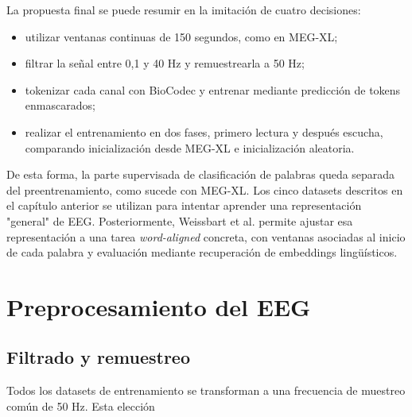 La propuesta final se puede resumir en la imitación de cuatro decisiones:

\begin{itemize}
\setlength{\itemsep}{0pt}
\setlength{\parsep}{0pt}
\setlength{\topsep}{2pt}
\setlength{\partopsep}{0pt}
\item utilizar ventanas continuas de 150 segundos, como en MEG-XL;
\item filtrar la señal entre 0,1 y 40 Hz y remuestrearla a 50 Hz;
\item tokenizar cada canal con BioCodec y entrenar mediante predicción de tokens enmascarados;
\item realizar el entrenamiento en dos fases, primero lectura y después escucha, comparando inicialización desde MEG-XL e inicialización aleatoria.
\end{itemize}

De esta forma, la parte supervisada de clasificación de palabras queda separada del preentrenamiento, como sucede con MEG-XL. Los cinco datasets descritos en el capítulo anterior se utilizan para intentar aprender una representación "general" de EEG. Posteriormente, Weissbart et al. permite ajustar esa representación a una tarea \textit{word-aligned} concreta, con ventanas asociadas al inicio de cada palabra y evaluación mediante recuperación de embeddings lingüísticos.

\section{Preprocesamiento del EEG}

\subsection{Filtrado y remuestreo}


Todos los datasets de entrenamiento se transforman a una frecuencia de muestreo común de 50 Hz. Esta elección


